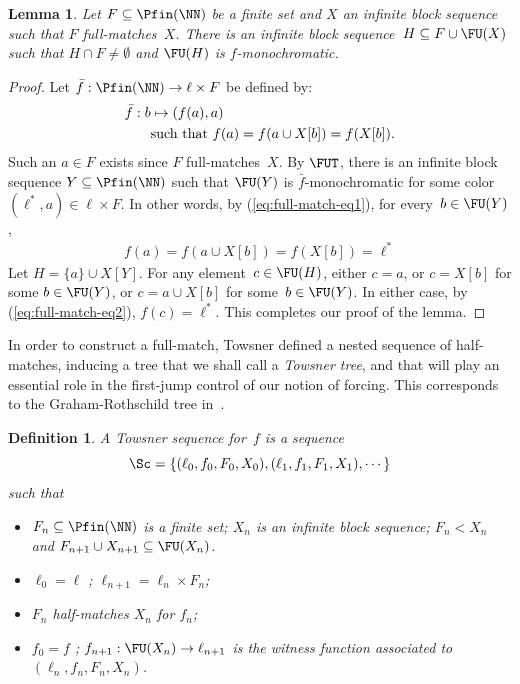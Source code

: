 \documentclass{article}
\numberwithin{theorem}{section}
\newtheorem{lemma}[theorem]{Lemma}
\newtheorem{definition}[theorem]{Definition}
\begin{document}
\begin{lemma}
Let $F \subseteq \Pfin(\NN)$ be a finite set and $X$ an infinite block sequence such that $F$ full-matches~$X$.
There is an infinite block sequence~$H \subseteq F \cup \FU(X)$ such that $H \cap F \neq \emptyset$ and $\FU(H)$ is $f$-monochromatic. 
\end{lemma}
\begin{proof}
Let $\bar f : \Pfin(\NN) \to \ell \times F$ be defined by:
\begin{align}\label{eq:full-match-eq1}
\bar f : b & \mapsto (f(a), a) \notag \\
& \text{such that } f(a) = f(a \cup X[b]) = f(X[b]).
\end{align}
Such an $a \in F$ exists since $F$ full-matches~$X$.
By $\FUT$, there is an infinite block sequence $Y \subseteq \Pfin(\NN)$ such that $\FU(Y)$ is $\bar f$-monochromatic for some color $(\ell^*, a) \in \ell \times F$. In other words, by (\ref{eq:full-match-eq1}), for every~$b \in \FU(Y)$,
\begin{align}\label{eq:full-match-eq2}
f(a) = f(a \cup X[b]) = f(X[b]) = \ell^*
\end{align}
Let $H = \{a\} \cup X[Y]$. For any element~$c \in \FU(H)$, either $c = a$, or $c = X[b]$ for some $b \in \FU(Y)$, or $c = a \cup X[b]$ for some~$b \in \FU(Y)$. In either case, by (\ref{eq:full-match-eq2}), $f(c) = \ell^*$. This completes our proof of the lemma.
\end{proof}

In order to construct a full-match, Towsner defined a nested sequence of half-matches, inducing a tree that we shall call a \emph{Towsner tree}, and that will play an essential role in the first-jump control of our notion of forcing. This corresponds to the Graham-Rothschild tree in~\cite{liu2026reverse}.

\begin{definition}
A \emph{Towsner sequence} for~$f$ is a sequence 
$$\Sc = \{ (\ell_0, f_0, F_0, X_0), (\ell_1, f_1, F_1, X_1), \cdots \}$$
such that 
\begin{itemize}
    \item[(1)] $F_n \subseteq \Pfin(\NN)$ is a finite set; $X_n$ is an infinite block sequence; $F_n < X_n$ and $F_{n+1} \cup X_{n+1} \subseteq \FU(X_n)$.
    \item[(2)] $\ell_0 = \ell$ ; $\ell_{n+1} = \ell_n \times F_n$;
    \item[(3)] $F_n$ half-matches $X_n$ for $f_n$;
    \item[(4)] $f_0 = f$ ; $f_{n+1} : \FU(X_n) \to \ell_{n+1}$ is the witness function associated to $(\ell_n, f_n, F_n, X_n)$.
\end{itemize}
\end{definition}
\end{document}
